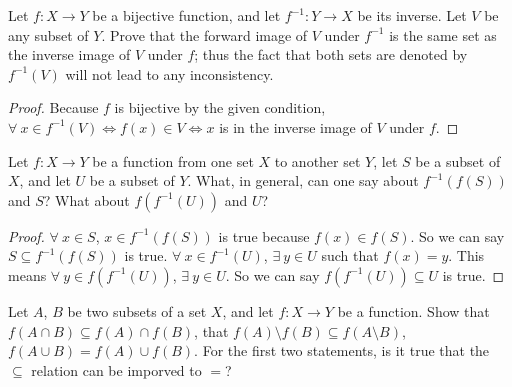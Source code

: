 \exercisesection

\begin{exercise}\label{ex 3.4.1}
Let \(f : X \to Y\) be a bijective function, and let \(f^{-1} : Y \to X\) be its inverse.
Let \(V\) be any subset of \(Y\).
Prove that the forward image of \(V\) under \(f^{-1}\) is the same set as the inverse image of \(V\) under \(f\);
thus the fact that both sets are denoted by \(f^{-1}(V)\) will not lead to any inconsistency.
\end{exercise}

\begin{proof}
Because \(f\) is bijective by the given condition, \(\forall\ x \in f^{-1}(V) \iff f(x) \in V \iff x\) is in the inverse image of \(V\) under \(f\).
\end{proof}

\begin{exercise}\label{ex 3.4.2}
Let \(f : X \to Y\) be a function from one set \(X\) to another set \(Y\), let \(S\) be a subset of \(X\), and let \(U\) be a subset of \(Y\).
What, in general, can one say about \(f^{-1}(f(S))\) and \(S\)?
What about \(f(f^{-1}(U))\) and \(U\)?
\end{exercise}

\begin{proof}
\(\forall\ x \in S\), \(x \in f^{-1}(f(S))\) is true because \(f(x) \in f(S)\).
So we can say \(S \subseteq f^{-1}(f(S))\) is true.
\(\forall\ x \in f^{-1}(U)\), \(\exists\ y \in U\) such that \(f(x) = y\).
This means \(\forall\ y \in f(f^{-1}(U))\), \(\exists\ y \in U\).
So we can say \(f(f^{-1}(U)) \subseteq U\) is true.
\end{proof}

\begin{exercise}\label{ex 3.4.3}
Let \(A\), \(B\) be two subsets of a set \(X\), and let \(f : X \to Y\) be a function.
Show that \(f(A \cap B) \subseteq f(A) \cap f(B)\), that \(f(A) \setminus f(B) \subseteq f(A \setminus B)\), \(f(A \cup B) = f(A) \cup f(B)\).
For the first two statements, is it true that the \(\subseteq\) relation can be imporved to \(=\)?
\end{exercise}

